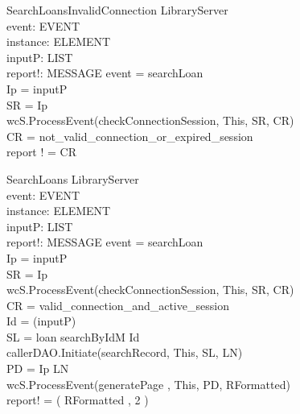 \begin{schema}{SearchLoansInvalidConnection}
\Xi LibraryServer \\
event: EVENT \\
instance: ELEMENT \\
inputP: LIST \\
report!: MESSAGE
\where event = searchLoan \\
Ip = \head inputP \\
SR = \lseq Ip \rseq \\ 
wcS.ProcessEvent(checkConnectionSession, This, SR, CR) \\
CR = not\_valid\_connection\_or\_expired\_session \\ 
report ! = CR
\end{schema}


\begin{schema}{SearchLoans}
\Xi LibraryServer \\
event: EVENT \\
instance: ELEMENT \\
inputP: LIST \\
report!: MESSAGE
\where event = searchLoan \\
Ip = \head inputP \\
SR = \lseq Ip \rseq \\ 
wcS.ProcessEvent(checkConnectionSession, This, SR, CR) \\
CR = valid\_connection\_and\_active\_session \\
Id = \head (\tail inputP) \\ 
SL = \lseq loan searchByIdM Id \rseq \\
callerDAO.Initiate(searchRecord, This, SL, LN) \\
PD = \lseq Ip LN \rseq \\
wcS.ProcessEvent(generatePage , This, PD, RFormatted) \\
report! = \sort( RFormatted , 2 )
\end{schema}

